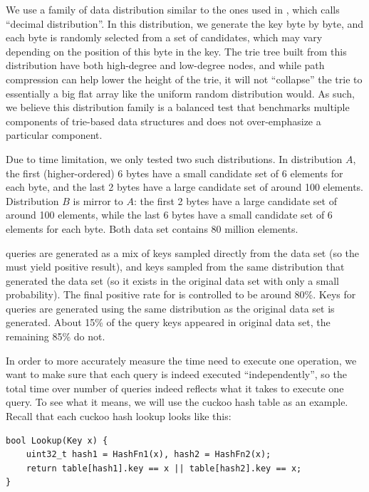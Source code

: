 \documentclass[11pt, usletter]{article}
\begin{document}
We use a family of data distribution similar to the ones used in \cite{masstree}, which \cite{masstree} calls ``decimal distribution''. 
In this distribution, we generate the key byte by byte, and each byte is randomly selected from a set of candidates, 
which may vary depending on the position of this byte in the key.
The trie tree built from this distribution have both high-degree and low-degree nodes, 
and while path compression can help lower the height of the trie, it will not ``collapse'' the trie 
to essentially a big flat array like the uniform random distribution would. 
As such, we believe this distribution family is a balanced test that 
benchmarks multiple components of trie-based data structures and does not over-emphasize a particular component. 

Due to time limitation, we only tested two such distributions. 
In distribution $A$, the first (higher-ordered) 6 bytes have a small candidate set of 6 elements for each byte, 
and the last 2 bytes have a large candidate set of around 100 elements. 
Distribution $B$ is mirror to $A$: the first 2 bytes have a large candidate set of around 100 elements,
while the last 6 bytes have a small candidate set of 6 elements for each byte.
Both data set contains 80 million elements.

\lookup queries are generated as a mix of keys sampled directly from the data set (so the \lookup must yield positive result),
and keys sampled from the same distribution that generated the data set (so it exists in the original data set 
with only a small probability). The final positive rate for \lookup is controlled to be around 80\%. 
Keys for \lowerbound queries are generated using the same distribution as the original data set is generated. 
About 15\% of the \lowerbound query keys appeared in original data set, the remaining 85\% do not. 

In order to more accurately measure the time need to execute one operation, 
we want to make sure that each query is indeed executed ``independently'', 
so the total time over number of queries indeed reflects what it takes to execute one query. 
To see what it means, we will use the cuckoo hash table as an example. 
Recall that each cuckoo hash lookup looks like this:

\singlespacing\begin{codebox}
\begin{verbatim}
bool Lookup(Key x) {
    uint32_t hash1 = HashFn1(x), hash2 = HashFn2(x);
    return table[hash1].key == x || table[hash2].key == x;
}
\end{verbatim}
\end{codebox}\doublespacing
\end{document}

